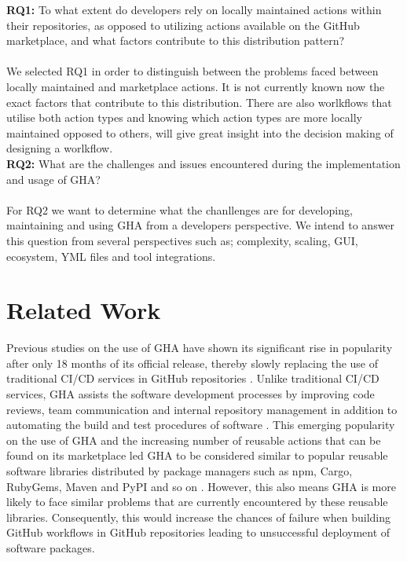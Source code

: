 \documentclass[conference]{IEEEtran}
\begin{document}
     \textbf{RQ1:} To what extent do developers rely on locally maintained actions within their repositories, as opposed to utilizing actions available on the GitHub marketplace, and what factors contribute to this distribution pattern?
\\
\\
We selected RQ1 in order to distinguish between the problems faced between locally maintained and marketplace actions. It is not currently known now the exact factors that contribute to this distribution. There are also worlkflows that utilise both action types and knowing which action types are more locally maintained opposed to others, will give great insight into the decision making of designing a worlkflow. \\

     \textbf{RQ2:} What are the challenges and issues encountered during the implementation and usage of GHA?\\
\\
For RQ2 we want to determine what the chanllenges are for developing, maintaining and using GHA from a developers perspective. We intend to answer this question from several perspectives such as; complexity, scaling, GUI, ecosystem, YML files and tool integrations.


\section{Related Work}
Previous studies on the use of GHA have shown its significant rise in popularity after only 18 months of its official release, thereby slowly replacing the use of traditional CI/CD services in GitHub repositories \cite{b15}. Unlike traditional CI/CD services, GHA assists the software development processes by improving code reviews, team communication and internal repository management in addition to automating the build and test procedures of software \cite{b16}. This emerging popularity on the use of GHA and the increasing number of reusable actions that can be found on its marketplace led GHA to be considered similar to popular reusable software libraries distributed by package managers such as npm, Cargo, RubyGems, Maven and PyPI and so on \cite{b4}. However, this also means GHA is more likely to face similar problems that are currently encountered by these reusable libraries. Consequently, this would increase the chances of failure when building GitHub workflows in GitHub repositories leading to unsuccessful deployment of software packages. 
\\
\end{document}
